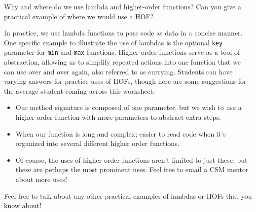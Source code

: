 \begin{blocksection}
\question Why and where do we use lambda and higher-order functions? Can you give a practical example of where we would use a HOF?

\begin{solution}[0.5in]
In practice, we use lambda functions to pass code as data in a concise manner. One specific example to illustrate the use of lambdas is the optional \lstinline{key} parameter for \lstinline{min} and \lstinline{max} functions.
Higher order functions serve as a tool of abstraction, allowing us to simplify repeated actions into one function that we can use over and over again, also referred to as currying.
Students can have varying answers for practice uses of HOFs, though here are some suggestions for the average student coming across this worksheet:
\begin{itemize}
    \item Our method signature is composed of one parameter, but we wish to use a higher order function with more parameters to abstract extra steps.
    \item When our function is long and complex; easier to read code when it's organized into several different higher order functions.
    \item Of course, the uses of higher order functions aren't limited to just these, but these are perhaps the most prominent uses. Feel free to email a CSM mentor about more uses!
\end{itemize}

\end{solution}
\end{blocksection}

\begin{questionmeta}
    Feel free to talk about any other practical examples of lambdas or HOFs that you know about!
\end{questionmeta}
